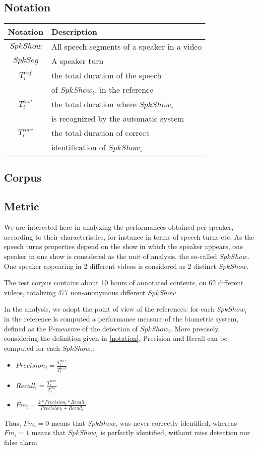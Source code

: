 \subsection{Notation}

\begin{tabular}{|c|l|}
\hline 
Notation & Description \\ 
\hline 
\hline
$SpkShow$ & All speech segments of a speaker in a video \\ 
$SpkSeg$  & A speaker turn \\
$T^{ref}_i$ & the total duration of the speech\\
& of  $SpkShow_i$, in the reference \\
$T^{test}_i$ & the total duration where $SpkShow_i$\\
& is recognized by the automatic system\\
$T^{corr}_i$ & the total duration of correct\\
& identification of $SpkShow_i$\\
\hline 
\end{tabular} 



\subsection{Corpus}



\subsection{Metric}

We are interested here in analyzing the performances obtained per speaker, according to their characteristics, for instance in terms of speech turns etc. As the speech turns properties depend on the show in which the speaker appears, one speaker in one show is considered as the unit of analysis, the so-called $SpkShow$. One speaker appearing in 2 different videos is considered as 2 distinct $SpkShow$.

The test corpus contains about 10 hours of annotated contents, on 62 different videos, totalizing 477 non-anonymous different $SpkShow$.

In the analysis, we adopt the point of view of the references: for each $SpkShow_i$ in the reference is computed a performance measure of the biometric system, defined as the F-measure of the detection of $SpkShow_i$. More precisely, considering the definition given in \ref{notation}, Precision and Recall can be computed for each $SpkShow_i$:
\begin{itemize}
\item $Precision_i=\frac{T^{corr}_i}{T^{test}_i}$
\item $Recall_i=\frac{T^{corr}_i}{T^{ref}_i}$
\item $Fm_i=\frac{2*Precision_i*Recall_i}{Precision_i+Recall_i}$
\end{itemize} 

Thus, $Fm_i=0$ means that $SpkShow_i$ was never correctly identified, whereas $Fm_i=1$ means that $SpkShow_i$ is perfectly identified, without miss detection nor false alarm.


